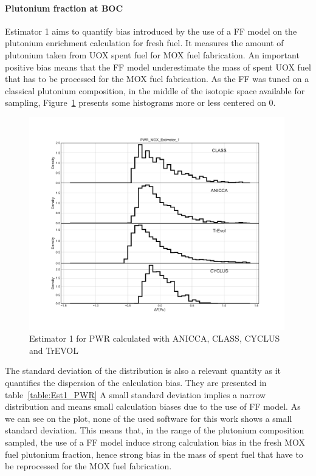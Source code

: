 \paragraph{Plutonium fraction at \gls{BOC}}

Estimator 1 aims to quantify bias introduced by the use of a \gls{FF} model on the
plutonium enrichment calculation for fresh fuel. It measures the amount of
plutonium taken from UOX spent fuel for MOX fuel fabrication. An important
positive bias means that the \gls{FF} model underestimate the mass of spent UOX fuel
that has to be processed for the MOX fuel fabrication. As the \gls{FF} was tuned on a
classical plutonium composition, in the middle of the isotopic space available
for sampling, Figure~\ref{fig:Est1_PWR} presents some histograms more or less
centered on 0.
        

\begin{figure}[h]
	\begin{center}
		\includegraphics[width = 0.99\textwidth]{../../Feature_1/RAW_DATA/FIG/PWR_MOX_Estimator_1.pdf}
		\caption{Estimator 1 for \gls{PWR} calculated with ANICCA, CLASS, CYCLUS and TrEVOL}
		\label{fig:Est1_PWR}
	\end{center}
\end{figure}

The standard deviation of the distribution is also a relevant quantity as it
quantifies the dispersion of the calculation bias. They are presented in
table~\ref{table:Est1_PWR} A small standard deviation implies a narrow
distribution and means small calculation biases due to the use of \gls{FF} model. As
we can see on the plot, none of the used software for this work shows a small
standard deviation. This means that, in the range of the plutonium composition
sampled, the use of a \gls{FF} model induce strong calculation bias in the fresh MOX
fuel plutonium fraction, hence strong bias in the mass of spent fuel that have
to be reprocessed for the MOX fuel fabrication.

